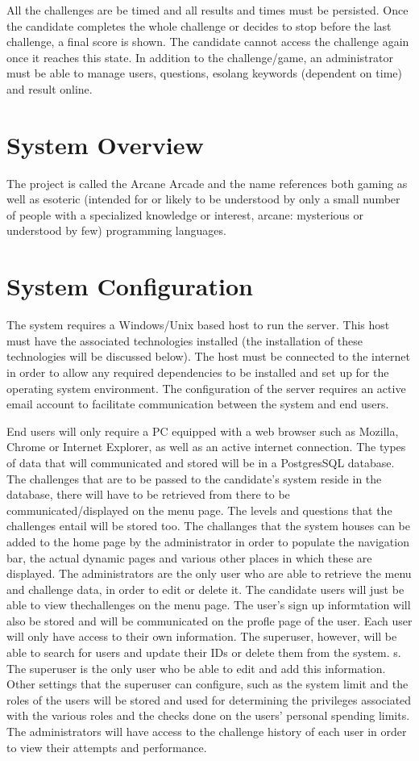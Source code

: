 \documentclass[english]{article}
\begin{document}
		All the challenges are be timed and all results and times must be persisted. Once the candidate completes the whole challenge or decides to stop before the last challenge, a final score is shown. The candidate cannot access the challenge again once it reaches this state. In addition to the challenge/game, an administrator must be able to manage users, questions, esolang keywords (dependent on time) and result online.
		
		
	\section{System Overview}
	The project is called the Arcane Arcade and the name references both gaming as well as esoteric (intended for or likely to be understood by only a 		small number of people with a specialized knowledge or interest, arcane: mysterious or understood by few) programming languages.
	
	\section{System Configuration}
	The system requires a Windows/Unix based host to run the server. This
host must have the associated technologies installed (the installation of these
technologies will be discussed below). The host must be connected to the
internet in order to allow any required dependencies to be installed and set
up for the operating system environment. The configuration of the server
requires an active email account to facilitate communication between the
system and end users.
	
	End users will only require a PC equipped with a web browser such as Mozilla,
Chrome or Internet Explorer, as well as an active internet connection. The
types of data that will communicated and stored will be in a PostgresSQL database. The challenges that are to be passed to the candidate's system reside in the database, there will have to be retrieved from there to be communicated/displayed on the menu page. The levels and questions that the
challenges entail will be stored too. The challanges that the system houses can be added to
the home page by the administrator in
order to populate the navigation bar, the actual dynamic pages and various
other places in which these are displayed. The administrators are the only
user who are able to retrieve the menu and challenge data, in order to edit
or delete it. The candidate users will just be able to view thechallenges on the
menu page. The user's sign up informtation will also be stored and will be
communicated on the profle page of the user. Each user will only have access
to their own information. The superuser, however, will be able to search for
users and update their IDs or delete them from the system. s. The superuser is the
only user who be able to edit and add this information. Other settings that
the superuser can configure, such as the system limit and the roles of the
users will be stored and used for determining the privileges associated with
the various roles and the checks done on the users' personal spending limits.
The administrators will have access to the challenge history of each user in
order to view their attempts and performance.
\end{document}
